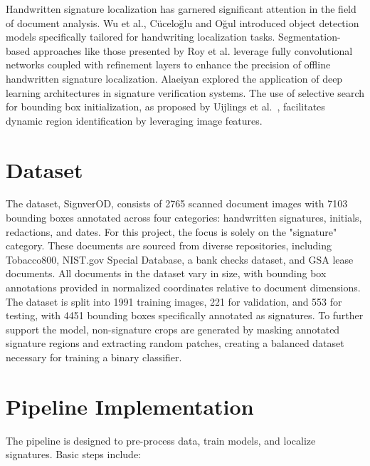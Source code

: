 \documentclass[a4paper,12pt]{article}
\begin{document}
Handwritten signature localization has garnered significant attention in the field of document analysis. Wu et al.\cite{wu2021}, Cüceloğlu and Oğul\cite{cuceloglu2018} introduced object detection models specifically tailored for handwriting localization tasks. Segmentation-based approaches like those presented by Roy et al.\cite{roy2020} leverage fully convolutional networks coupled with refinement layers to enhance the precision of offline handwritten signature localization. Alaeiyan\cite{alaeiyan2022} explored the application of deep learning architectures in signature verification systems. The use of selective search for bounding box initialization, as proposed by Uijlings et al.~\cite{victor2013}, facilitates dynamic region identification by leveraging image features.

\section{Dataset}
The dataset, SignverOD, consists of 2765 scanned document images with 7103 bounding boxes annotated across four categories: handwritten signatures, initials, redactions, and dates. For this project, the focus is solely on the "signature" category. These documents are sourced from diverse repositories, including Tobacco800, NIST.gov Special Database, a bank checks dataset, and GSA lease documents. All documents in the dataset vary in size, with bounding box annotations provided in normalized coordinates relative to document dimensions. The dataset is split into 1991 training images, 221 for validation, and 553 for testing, with 4451 bounding boxes specifically annotated as signatures. To further support the model, non-signature crops are generated by masking annotated signature regions and extracting random patches, creating a balanced dataset necessary for training a binary classifier.

\section{Pipeline Implementation}
The pipeline is designed to pre-process data, train models, and localize signatures. Basic steps include:
\end{document}

